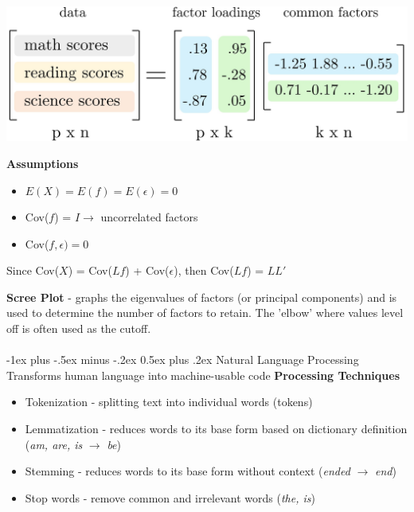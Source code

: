 \documentclass[10pt,landscape]{article}
\makeatletter
\renewcommand{\section}{\@startsection{section}{1}{0mm}%
                                {-1ex plus -.5ex minus -.2ex}%
                                {0.5ex plus .2ex}%
                                {\normalfont\large\bfseries}}
\makeatother
\begin{document}
\begin{multicols}{3}
\begin{center}
    \includegraphics[scale = .1]{images/factorNew1.JPG}
\end{center}
\vspace{-2mm}
\textbf{Assumptions}
\begin{itemize}[label={--},leftmargin=4mm]
\itemsep -.4mm 
\item $E(X) = E(f) = E(\epsilon) = 0$
\item Cov($f$) = $I \to $ uncorrelated factors
\item Cov($f,\epsilon) = 0$
\end{itemize}

Since Cov($X$) = Cov($Lf$) + Cov($\epsilon$), then Cov($Lf$) = $LL'$

\smallskip
\textbf{Scree Plot} - graphs the eigenvalues of factors (or principal components) and is used to determine the number of factors to retain. The 'elbow' where values level off is often used as the cutoff.
\columnbreak
\\\textcolor{white}{.}\vspace{-5mm}\\ %
\section{Natural Language Processing}
Transforms human language into machine-usable code
\textbf{Processing Techniques}
\begin{itemize}[label={--},leftmargin=4mm]
\itemsep -.4mm 
\item Tokenization - splitting text into individual words (tokens)
\item Lemmatization - reduces words to its base form based on dictionary definition (\emph{am, are, is} $\to$ \emph{be})
\item Stemming - reduces words to its base form without context (\emph{ended} $\to$ \emph{end})
\item Stop words - remove common and irrelevant words (\emph{the, is})
\end{itemize}   


\end{multicols}
\end{document}
